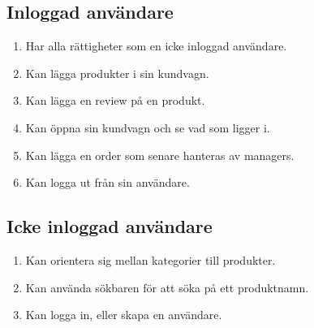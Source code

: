 \documentclass[a4paper]{article}
\begin{document}
\subsection{Inloggad användare}
\begin{enumerate}
  \item Har alla rättigheter som en icke inloggad användare.
  \item Kan lägga produkter i sin kundvagn.
  \item Kan lägga en review på en produkt.
  \item Kan öppna sin kundvagn och se vad som ligger i.
  \item Kan lägga en order som senare hanteras av managers.
  \item Kan logga ut från sin användare.
\end{enumerate}
%
\subsection{Icke inloggad användare}
\begin{enumerate}
  \item Kan orientera sig mellan kategorier till produkter.
  \item Kan använda sökbaren för att söka på ett produktnamn.
  \item Kan logga in, eller skapa en användare.
\end{enumerate}
%
\end{document}

